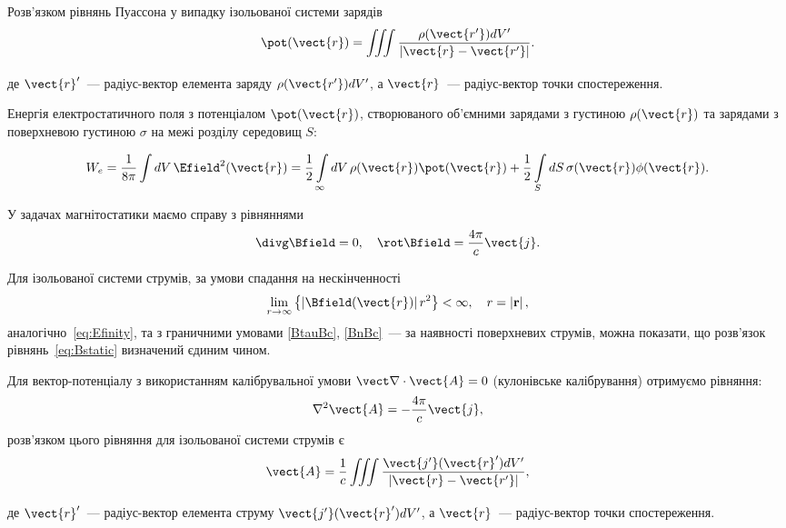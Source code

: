 \begin{Theory}
	Розв'язком рівнянь Пуассона у випадку ізольованої системи зарядів
	\begin{equation}\label{Supperposition_principle}
		\pot(\vect{r}) = \iiint\limits_{} \frac{\rho(\vect{r'}) dV'}{\left| \vect{r} - \vect{r'} \right|}.
	\end{equation}
	де $\vect{r}'$~--- радіус-вектор елемента заряду $\rho(\vect{r'}) dV'$, а $\vect{r}$~--- радіус-вектор точки спостереження.

Енергія електростатичного поля з потенціалом $\pot(\vect{r})$, створюваного об’ємними зарядами з густиною $\rho(\vect{r})$  та зарядами з поверхневою густиною $\sigma$  на межі розділу середовищ $S$:


\begin{equation}\label{eq:We}
W_e = \frac{1}{8\pi}\int {dV} \, \Efield^2(\vect{r}) = \frac{1}{2}\int\limits_\infty  dV\, \rho (\vect{r}) \pot(\vect{r}) + \frac{1}{2}\int\limits_S dS\, \sigma(\vect{r}) \phi (\vect{r}).
\end{equation}


	У задачах магнітостатики маємо справу з рівняннями
	\begin{equation}\label{eq:Bstatic}
		\divg\Bfield = 0, \quad \rot\Bfield = \frac{4\pi}{c}\vect{j}.
	\end{equation}

	Для ізольованої системи струмів, за умови спадання на нескінченності
	\begin{equation}\label{}
		\lim\limits_{r \to \infty } \left\{ {\left| \Bfield(\vect{r}) \right|{r^2}} \right\} < \infty ,\quad r = \left| {\bf{r}} \right|,
	\end{equation}
	аналогічно~\eqref{eq:Efinity}, та з граничними умовами \eqref{BtauBc}, \eqref{BnBc}~--- за наявності поверхневих струмів, можна показати, що розв’язок рівнянь~\eqref{eq:Bstatic} визначений єдиним чином.

	Для вектор-потенціалу з використанням калібрувальної умови $\vect\nabla\cdot\vect{A} = 0$ (кулонівське калібрування) отримуємо рівняння:
	\begin{equation}
		\nabla^2\vect{A} = - \frac{4\pi}{c}\vect{j},
	\end{equation}
    розв'язком цього рівняння для ізольованої системи струмів є
	\begin{equation}
		\vect{A} = \frac1c \iiint\limits_{} \frac{\vect{j'}(\vect{r}') dV'}{\left| \vect{r} - \vect{r'} \right|},
	\end{equation}
	де $\vect{r}'$~--- радіус-вектор елемента струму $\vect{j'}(\vect{r}') dV'$, а $\vect{r}$~--- радіус-вектор точки спостереження.


\end{Theory}
